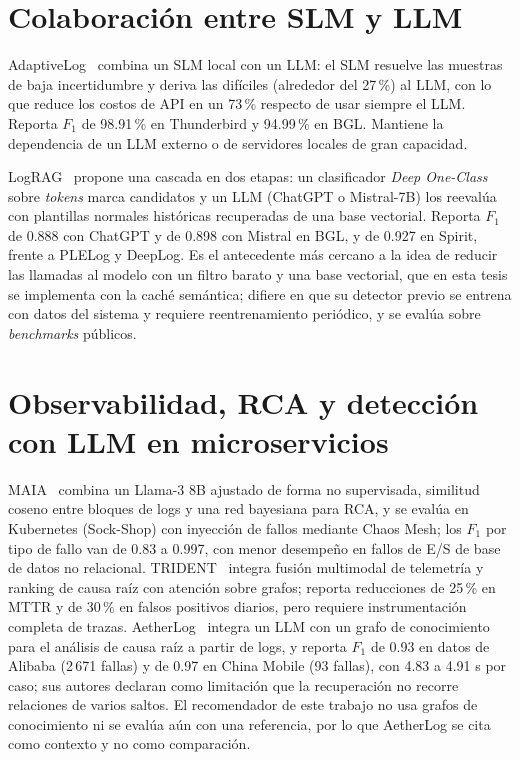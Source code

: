 \section{Colaboración entre SLM y LLM}\label{sec:tr_colaboracion}

AdaptiveLog~\cite{ma2026_adaptivelog} combina un SLM local con un LLM: el SLM resuelve las muestras de baja incertidumbre y deriva las difíciles (alrededor del 27\,\%) al LLM, con lo que reduce los costos de API en un 73\,\% respecto de usar siempre el LLM. Reporta $F_1$ de 98.91\,\% en Thunderbird y 94.99\,\% en BGL. Mantiene la dependencia de un LLM externo o de servidores locales de gran capacidad.

LogRAG~\cite{zhang2024_lograg} propone una cascada en dos etapas: un clasificador \textit{Deep One-Class} sobre \textit{tokens} marca candidatos y un LLM (ChatGPT o Mistral-7B) los reevalúa con plantillas normales históricas recuperadas de una base vectorial. Reporta $F_1$ de 0.888 con ChatGPT y de 0.898 con Mistral en BGL, y de 0.927 en Spirit, frente a PLELog y DeepLog. Es el antecedente más cercano a la idea de reducir las llamadas al modelo con un filtro barato y una base vectorial, que en esta tesis se implementa con la caché semántica; difiere en que su detector previo se entrena con datos del sistema y requiere reentrenamiento periódico, y se evalúa sobre \textit{benchmarks} públicos.

\section{Observabilidad, RCA y detección con LLM en microservicios}\label{sec:tr_observabilidad}

MAIA~\cite{pedroso2025_maia} combina un Llama-3 8B ajustado de forma no supervisada, similitud coseno entre bloques de logs y una red bayesiana para RCA, y se evalúa en Kubernetes (Sock-Shop) con inyección de fallos mediante Chaos Mesh; los $F_1$ por tipo de fallo van de 0.83 a 0.997, con menor desempeño en fallos de E/S de base de datos no relacional. TRIDENT~\cite{dutta2025_trident} integra fusión multimodal de telemetría y ranking de causa raíz con atención sobre grafos; reporta reducciones de 25\,\% en MTTR y de 30\,\% en falsos positivos diarios, pero requiere instrumentación completa de trazas. AetherLog~\cite{cui2025_aetherlog} integra un LLM con un grafo de conocimiento para el análisis de causa raíz a partir de logs, y reporta $F_1$ de 0.93 en datos de Alibaba (2\,671 fallas) y de 0.97 en China Mobile (93 fallas), con 4.83 a 4.91 s por caso; sus autores declaran como limitación que la recuperación no recorre relaciones de varios saltos. El recomendador de este trabajo no usa grafos de conocimiento ni se evalúa aún con una referencia, por lo que AetherLog se cita como contexto y no como comparación.

